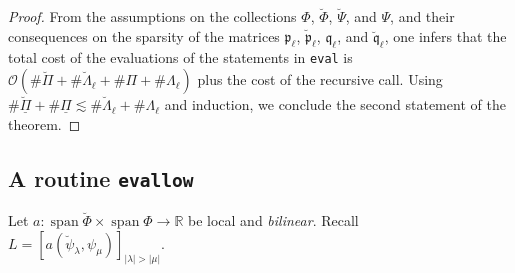 \documentclass{amsart}
\theoremstyle{definition}
\theoremstyle{remark}
\numberwithin{equation}{section}
\newcommand{\R}{\mathbb R}
\DeclareMathOperator{\Span}{span}
\newcommand{\1}{\mathbb 1}
\begin{document}
\begin{proof}
 
 From the assumptions on the collections $\Phi$, $\breve{\Phi}$, $\breve{\Psi}$, and $\Psi$, and their consequences on the sparsity of the matrices $\mathfrak{p}_{\ell} $, $\breve{\mathfrak{p}}_{\ell}$, $\mathfrak{q}_\ell$, and $\mathfrak{\breve{q}}_\ell$, one infers that the total cost of the evaluations of the statements in \texttt{eval} is ${\mathcal O}(\# \breve{\Pi}+\# \breve{\Lambda}_\ell+\# \Pi+\# \Lambda_\ell)$ plus the cost of the recursive call. Using 
 $ \# \breve{\underline{\Pi}} + \# \underline{\Pi} \lesssim \# \breve{\Lambda}_\ell+\# \Lambda_\ell$
 and induction, we conclude the second statement of the theorem.
 \end{proof}
 
 \newpage
  \subsection{A routine \texttt{evallow}} \label{SevalL}
  Let $a\colon \Span \breve{\Phi} \times \Span \Phi \rightarrow \R$ be local and {\em bilinear}.
Recall $L=[a(\breve{\psi}_\lambda,\psi_\mu)]_{|\lambda| > |\mu|}$.
\end{document}
